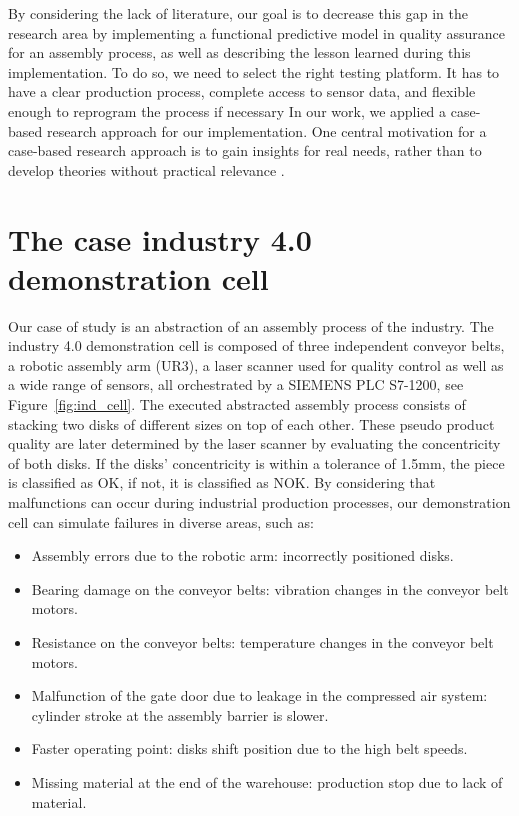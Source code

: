 \documentclass[5p,times,procedia]{elsarticle}
\newcommand{\AP}[1]{{\color{blue} {\bf (AP: #1)}}}
\begin{document}
By considering the lack of literature, our goal is to decrease this gap in the research area by implementing a functional predictive model in quality assurance for an assembly process, as well as describing the lesson learned during this implementation. To do so, we need to select the right testing platform. It has to have a clear production process, complete access to sensor data, and flexible enough to reprogram the process if necessary 
In our work, we applied a case-based research approach \cite{yin2017case} 
for our implementation.
One central motivation for a case-based research approach is to gain insights for real needs, rather than to develop theories without practical relevance \cite{cutcheon1993case}. %
       
\section{The case industry 4.0 demonstration cell} %


Our case of study is an abstraction of an assembly process of the industry. The industry 4.0 demonstration cell is composed of three independent conveyor belts, a robotic assembly arm (UR3), a laser scanner used for quality control as well as a wide range of sensors, all orchestrated by a SIEMENS PLC S7-1200, see Figure~\ref{fig:ind_cell}. 
The executed abstracted assembly process consists of stacking two disks of different sizes on top of each other. These pseudo product quality are later determined by the laser scanner by evaluating the concentricity of both disks. If the disks' concentricity is within a tolerance of 1.5mm, the piece is classified as OK, if not, it is classified as NOK.
By considering that malfunctions can occur during industrial production processes, our demonstration cell can simulate failures in diverse areas, such as:

\begin{itemize}
       \item Assembly errors due to the robotic arm: incorrectly positioned disks.
       \item Bearing damage on the conveyor belts: vibration changes in the conveyor belt motors.
       \item Resistance on the conveyor belts: temperature changes in the conveyor belt motors.
       \item Malfunction of the gate door due to leakage in the compressed air system: cylinder stroke at the assembly barrier is slower.
       \item Faster operating point: disks shift position due to the high belt speeds.
       \item Missing material at the end of the warehouse: production stop due to lack of material.
\end{itemize}
\end{document}
